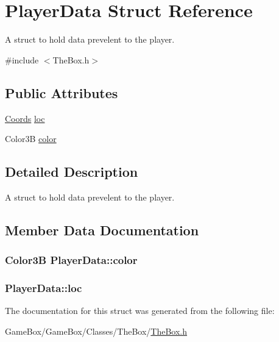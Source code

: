 \hypertarget{struct_player_data}{\section{\-Player\-Data \-Struct \-Reference}
\label{struct_player_data}
}


\-A struct to hold data prevelent to the player.  




{\ttfamily \#include $<$\-The\-Box.\-h$>$}

\subsection*{\-Public \-Attributes}
\begin{DoxyCompactItemize}
\item 
\hyperlink{struct_coords}{\-Coords} \hyperlink{struct_player_data_a6646f159881b83da159eb7410fad7fd5}{loc}
\item 
\-Color3\-B \hyperlink{struct_player_data_ad1fb36f8e37fa1ee21fece6f6634a3be}{color}
\end{DoxyCompactItemize}


\subsection{\-Detailed \-Description}
\-A struct to hold data prevelent to the player. 

\subsection{\-Member \-Data \-Documentation}
\hypertarget{struct_player_data_ad1fb36f8e37fa1ee21fece6f6634a3be}{
\subsubsection[{color}]{\setlength{\rightskip}{0pt plus 5cm}\-Color3\-B {\bf \-Player\-Data\-::color}}}\label{struct_player_data_ad1fb36f8e37fa1ee21fece6f6634a3be}
\hypertarget{struct_player_data_a6646f159881b83da159eb7410fad7fd5}{
\subsubsection[{loc}]{ {\bf \-Player\-Data\-::loc}}}\label{struct_player_data_a6646f159881b83da159eb7410fad7fd5}


\-The documentation for this struct was generated from the following file\-:\begin{DoxyCompactItemize}
\item 
\-Game\-Box/\-Game\-Box/\-Classes/\-The\-Box/\hyperlink{_the_box_8h}{\-The\-Box.\-h}\end{DoxyCompactItemize}
